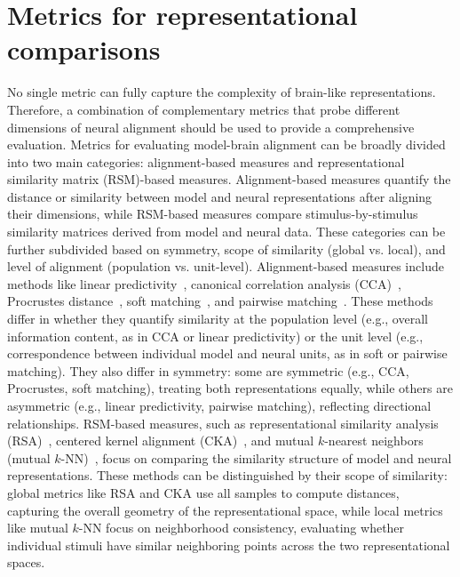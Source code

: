 \section{Metrics for representational comparisons} 
\label{ss:notions-metrics}
No single metric can fully capture the complexity of brain-like representations. Therefore, a combination of complementary metrics that probe different dimensions of neural alignment should be used to provide a comprehensive evaluation. Metrics for evaluating model-brain alignment can be broadly divided into two main categories: alignment-based measures and representational similarity matrix (RSM)-based measures. Alignment-based measures quantify the distance or similarity between model and neural representations after aligning their dimensions, while RSM-based measures compare stimulus-by-stimulus similarity matrices derived from model and neural data. These categories can be further subdivided based on symmetry, scope of similarity (global vs. local), and level of alignment (population vs. unit-level).
Alignment-based measures include methods like linear predictivity~\citep{yamins2014performance}, canonical correlation analysis (CCA)~\citep{hotelling1992relations}, Procrustes distance~\citep{williams2021generalized}, soft matching~\citep{khosla2024soft}, and pairwise matching~\citep{khosla2024privileged, li2015convergent}. These methods differ in whether they quantify similarity at the population level (e.g., overall information content, as in CCA or linear predictivity) or the unit level (e.g., correspondence between individual model and neural units, as in soft or pairwise matching). They also differ in symmetry: some are symmetric (e.g., CCA, Procrustes, soft matching), treating both representations equally, while others are asymmetric (e.g., linear predictivity, pairwise matching), reflecting directional relationships.
RSM-based measures, such as representational similarity analysis (RSA)~\citep{kriegeskorte2008representational}, centered kernel alignment (CKA)~\citep{kornblith2019similarity}, and mutual $k$-nearest neighbors (mutual $k$-NN)~\citep{huhposition}, focus on comparing the similarity structure of model and neural representations. These methods can be distinguished by their scope of similarity: global metrics like RSA and CKA use all samples to compute distances, capturing the overall geometry of the representational space, while local metrics like mutual $k$-NN focus on neighborhood consistency, evaluating whether individual stimuli have similar neighboring points across the two representational spaces.


